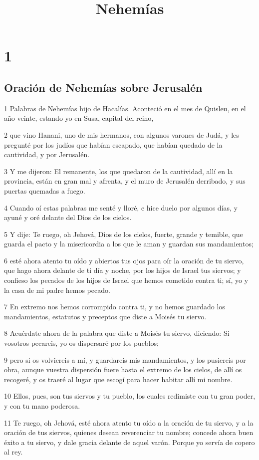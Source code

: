 

\title{Nehemías}

\chapter{1}

\section*{Oración de Nehemías sobre Jerusalén}

\par 1 Palabras de Nehemías hijo de Hacalías. Aconteció en el mes de Quisleu, en el año veinte, estando yo en Susa, capital del reino,
\par 2 que vino Hanani, uno de mis hermanos, con algunos varones de Judá, y les pregunté por los judíos que habían escapado, que habían quedado de la cautividad, y por Jerusalén.
\par 3 Y me dijeron: El remanente, los que quedaron de la cautividad, allí en la provincia, están en gran mal y afrenta, y el muro de Jerusalén derribado, y sus puertas quemadas a fuego.
\par 4 Cuando oí estas palabras me senté y lloré, e hice duelo por algunos días, y ayuné y oré delante del Dios de los cielos.
\par 5 Y dije: Te ruego, oh Jehová, Dios de los cielos, fuerte, grande y temible, que guarda el pacto y la misericordia a los que le aman y guardan sus mandamientos;
\par 6 esté ahora atento tu oído y abiertos tus ojos para oír la oración de tu siervo, que hago ahora delante de ti día y noche, por los hijos de Israel tus siervos; y confieso los pecados de los hijos de Israel que hemos cometido contra ti; sí, yo y la casa de mi padre hemos pecado.
\par 7 En extremo nos hemos corrompido contra ti, y no hemos guardado los mandamientos, estatutos y preceptos que diste a Moisés tu siervo.
\par 8 Acuérdate ahora de la palabra que diste a Moisés tu siervo, diciendo: Si vosotros pecareis, yo os dispersaré por los pueblos;
\par 9 pero si os volviereis a mí, y guardareis mis mandamientos, y los pusiereis por obra, aunque vuestra dispersión fuere hasta el extremo de los cielos, de allí os recogeré, y os traeré al lugar que escogí para hacer habitar allí mi nombre. 
\par 10 Ellos, pues, son tus siervos y tu pueblo, los cuales redimiste con tu gran poder, y con tu mano poderosa.
\par 11 Te ruego, oh Jehová, esté ahora atento tu oído a la oración de tu siervo, y a la oración de tus siervos, quienes desean reverenciar tu nombre; concede ahora buen éxito a tu siervo, y dale gracia delante de aquel varón. Porque yo servía de copero al rey.


